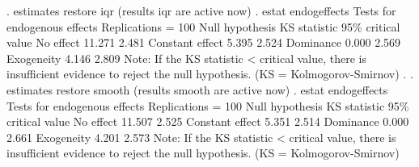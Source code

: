. estimates restore iqr
(results iqr are active now)
{\smallskip}
. estat endogeffects
{\smallskip}
Tests for endogenous effects          Replications = 100
Null hypothesis {\VBAR}     KS statistic    95\% critical value
No effect       {\VBAR}           11.271                 2.481
Constant effect {\VBAR}            5.395                 2.524
Dominance       {\VBAR}            0.000                 2.569
Exogeneity      {\VBAR}            4.146                 2.809
Note: If the KS statistic < critical value, there is
      insufficient evidence to reject the null
      hypothesis. (KS = Kolmogorov-Smirnov)
{\smallskip}
. 
. estimates restore smooth
(results smooth are active now)
{\smallskip}
. estat endogeffects
{\smallskip}
Tests for endogenous effects          Replications = 100
Null hypothesis {\VBAR}     KS statistic    95\% critical value
No effect       {\VBAR}           11.507                 2.525
Constant effect {\VBAR}            5.351                 2.514
Dominance       {\VBAR}            0.000                 2.661
Exogeneity      {\VBAR}            4.201                 2.573
Note: If the KS statistic < critical value, there is
      insufficient evidence to reject the null
      hypothesis. (KS = Kolmogorov-Smirnov)
